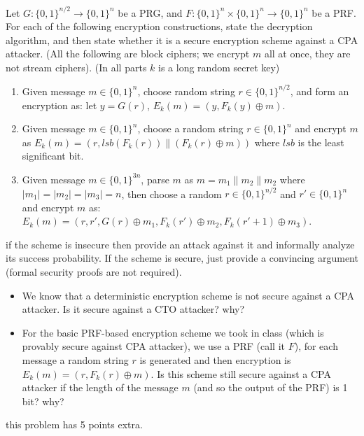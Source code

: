 \documentclass[12pt]{article}
\newcommand{\zo}{\{0,1\}}
\newcommand*\concat{\mathbin{\|}}
\newcommand\xor{\oplus}
\begin{document}
Let $G:\zo^{n/2} \to \zo^{n}$ be a PRG, and $F:\zo^n \times \zo^n \to \zo^n$ be a PRF. For each of the following encryption constructions, state the decryption algorithm, and then state whether it is a secure encryption scheme against a CPA attacker.  (All the following are block ciphers; we encrypt $m$ all at once, they are not stream ciphers). (In all parts $k$ is a long random secret key)  
\begin{enumerate}
\item Given message $m \in \zo^{n}$, choose random string $r \in \zo^{n/2}$, and form an encryption as: let $y = G(r)$, $E_k(m) = (y, F_k(y)\oplus m)$.  

\item Given message $m \in \zo^{n}$, choose a random string $r\in \zo^{n}$ and encrypt $m$ as $E_k(m) = (r, lsb(F_k(r))\concat (F_k(r)\oplus m))$ where $lsb$ is the least significant bit.

\item Given message $m \in \zo^{3n}$, parse $m$ as $m = m_1 \concat m_2 \concat m_2$ where $|m_1| = |m_2| = |m_3| = n$, then choose a random $r \in \zo^{n/2}$ and $r' \in \zo^n$ and encrypt $m$ as:\\
$E_k(m) = (r, r', G(r) \oplus m_1, F_k(r')\oplus m_2, F_k(r' + 1) \oplus m_3)$.
\end{enumerate} 


 if the scheme is insecure then provide an attack against it and informally analyze its success probability. If the scheme is secure, just provide a convincing argument (formal security proofs are not required).



\newpage
{}
\begin{itemize}
    \item We know that a deterministic encryption scheme is not secure against a CPA attacker. Is it secure against a CTO attacker? why?
    
    \item For the basic PRF-based encryption scheme we took in class (which is provably secure against CPA attacker), we use a PRF (call it $F$), for each message a random string $r$ is generated and then encryption is $E_k(m) = (r, F_k(r) \xor m)$. Is this scheme still secure against a CPA attacker if the length of the message $m$ (and so the output of the PRF) is 1 bit? why?  
\end{itemize}
 this problem has 5 points extra.\\
\end{document}
